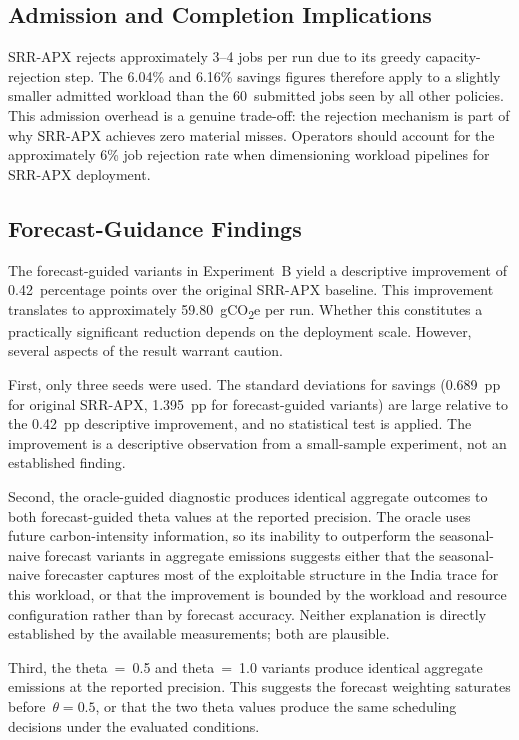 \documentclass[conference]{IEEEtran}
\begin{document}
\subsection{Admission and Completion Implications}

SRR-APX rejects approximately 3--4 jobs per run due to its greedy
capacity-rejection step. The 6.04\% and 6.16\% savings figures therefore apply
to a slightly smaller admitted workload than the 60~submitted jobs seen by all
other policies. This admission overhead is a genuine trade-off: the rejection
mechanism is part of why SRR-APX achieves zero material misses. Operators should
account for the approximately 6\% job rejection rate when dimensioning workload
pipelines for SRR-APX deployment.

\subsection{Forecast-Guidance Findings}

The forecast-guided variants in Experiment~B yield a descriptive improvement
of 0.42~percentage points over the original SRR-APX baseline. This
improvement translates to approximately 59.80~gCO\textsubscript{2}e per run.
Whether this constitutes a practically significant reduction depends on the
deployment scale. However, several aspects of the result warrant caution.

First, only three seeds were used. The standard deviations for savings
(0.689~pp for original SRR-APX, 1.395~pp for forecast-guided variants) are
large relative to the 0.42~pp descriptive improvement, and no statistical test
is applied. The improvement is a descriptive observation from a small-sample
experiment, not an established finding.

Second, the oracle-guided diagnostic produces identical aggregate outcomes to
both forecast-guided theta values at the reported precision. The oracle uses
future carbon-intensity information, so its inability to outperform the
seasonal-naive forecast variants in aggregate emissions suggests either that
the seasonal-naive forecaster captures most of the exploitable structure in the
India trace for this workload, or that the improvement is bounded by the
workload and resource configuration rather than by forecast accuracy. Neither
explanation is directly established by the available measurements; both are
plausible.

Third, the theta~=~0.5 and theta~=~1.0 variants produce identical aggregate
emissions at the reported precision. This suggests the forecast weighting
saturates before~$\theta = 0.5$, or that the two theta values produce the same
scheduling decisions under the evaluated conditions.
\end{document}

